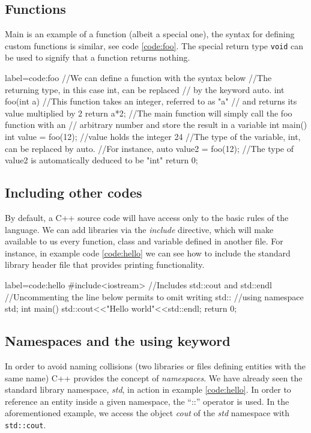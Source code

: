 \documentclass[twoside,openright,titlepage,numbers=noenddot,%
headinclude,footinclude,cleardoublepage=empty,abstract=on,
BCOR=5mm,fontsize=11pt, dvipsnames, paper=b5
]{scrreprt}
\def\ucpp{uammd_cpp_lexer.py:UAMMDCppLexer -x}
\begin{document}
\subsection*{Functions}
Main is an example of a function (albeit a special one), the syntax for defining custom functions is similar, see code \ref{code:foo}. The special return type \texttt{void} can be used to signify that a function returns nothing.

\begin{code2} {label=code:foo}
//We can define a function with the syntax below
//The returning type, in this case int, can be replaced 
// by the keyword auto.
int foo(int a){
  //This function takes an integer, referred to as "a"
  // and returns its value multiplied by 2
  return a*2;
}
//The main function will simply call the foo function with an
// arbitrary number and store the result in a variable
int main(){
  int value = foo(12);
  //value holds the integer 24
  //The type of the variable, int, can be replaced by auto.
  //For instance,
  auto value2 = foo(12);
  //The type of value2 is automatically deduced to be "int"
  return 0;
}
\end{code2}

\subsection*{Including other codes}
By default, a C++ source code will have access only to the basic rules of the language. We can add libraries via the \emph{include} directive, which will make available to us every function, class and variable defined in another file. For instance, in example code \ref{code:hello} we can see how to include the standard library header file that provides printing functionality.

\begin{code2} {label=code:hello}
  #include<iostream> //Includes std::cout and std::endl
  //Uncommenting the line below permits to omit writing std::
  //using namespace std;
  int main(){    
    std::cout<<"Hello world"<<std::endl;    
    return 0;  
  }
\end{code2}

\subsection*{Namespaces and the using keyword}
In order to avoid naming collisions (two libraries or files defining entities with the same name) C++ provides the concept of \emph{namespaces}. We have already seen the standard library namespace, \emph{std}, in action in example \ref{code:hello}. In order to reference an entity inside a given namespace, the ``::'' operator is used. In the aforementioned example, we access the object \emph{cout} of the \emph{std} namespace with \texttt{std::cout}.
\end{document}
